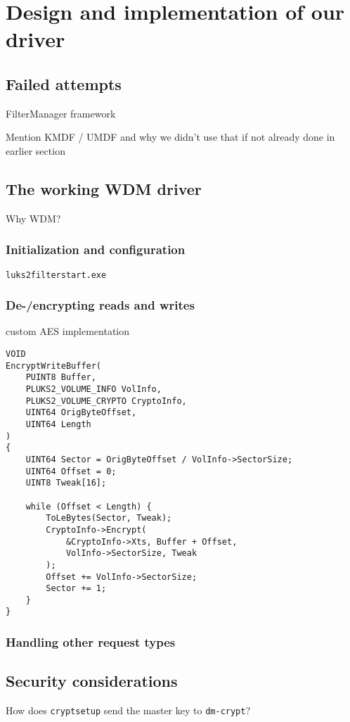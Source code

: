 \section{Design and implementation of our driver}

\subsection{Failed attempts}
FilterManager framework

Mention KMDF / UMDF and why we didn't use that if not already done in earlier section

\subsection{The working WDM driver}
Why WDM?

\subsubsection{Initialization and configuration}
\texttt{luks2filterstart.exe}

\subsubsection{De-/encrypting reads and writes}
custom AES implementation

\begin{lstlisting}[style=CStyle]
VOID
EncryptWriteBuffer(
    PUINT8 Buffer,
    PLUKS2_VOLUME_INFO VolInfo,
    PLUKS2_VOLUME_CRYPTO CryptoInfo,
    UINT64 OrigByteOffset,
    UINT64 Length
)
{
    UINT64 Sector = OrigByteOffset / VolInfo->SectorSize;
    UINT64 Offset = 0;
    UINT8 Tweak[16];

    while (Offset < Length) {
        ToLeBytes(Sector, Tweak);
        CryptoInfo->Encrypt(
            &CryptoInfo->Xts, Buffer + Offset,
            VolInfo->SectorSize, Tweak
        );
        Offset += VolInfo->SectorSize;
        Sector += 1;
    }
}
\end{lstlisting}

\subsubsection{Handling other request types}

\subsection{Security considerations}
How does \texttt{cryptsetup} send the master key to \texttt{dm-crypt}?